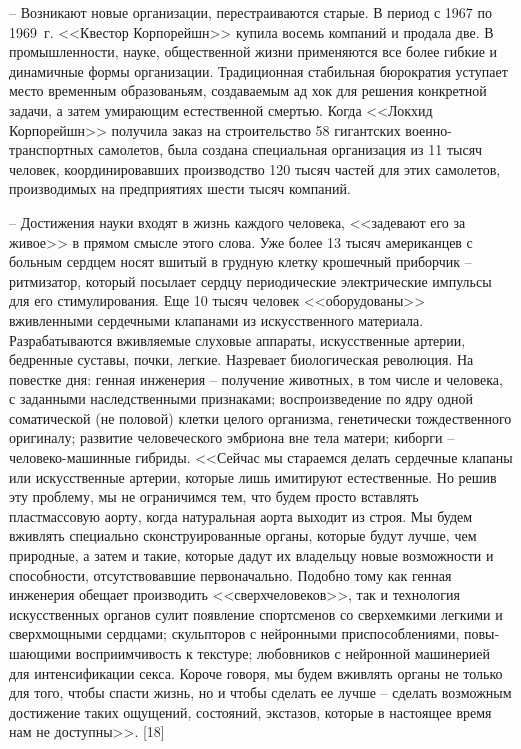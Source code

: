 \documentclass{book}
\begin{document}
-- Возникают новые организации, перестраиваются старые. В период с 1967 по 1969~г. <<Квестор Корпорейшн>> купила восемь компаний и продала две. В промышленности, науке, общественной жизни применяются все более гибкие и динамичные формы организации. Традиционная стабильная бюрократия уступает место временным образованьям, создаваемым ад хок для решения конкретной задачи, а затем умирающим естественной смертью. Когда <<Локхид Корпорейшн>> получила заказ на строительство 58 гигантских военно-транспортных самолетов, была создана специальная организация из 11 тысяч человек, координировавших производство 120 тысяч частей для этих самолетов, производимых на предприятиях шести тысяч компаний.

-- Достижения науки входят в жизнь каждого человека, <<задевают его за живое>> в прямом смысле этого слова. Уже бо­лее 13 тысяч американцев с больным сердцем носят вшитый в грудную клетку крошечный приборчик -- ритмизатор, который посылает сердцу периодические электрические импульсы для его стимулирования. Еще 10 тысяч человек <<оборудованы>> вживленными сердечными клапанами из искусственного материала. Разрабатываются вживляемые слуховые аппараты, искусственные артерии, бедренные суставы, почки, легкие. Назревает биологическая революция. На повестке дня: генная инже­нерия -- получение животных, в том числе и человека, с заданными наследственными признаками; воспроизведение по ядру одной соматической (не половой) клетки целого организма, генетически тождественного оригиналу; развитие человеческого эмбриона вне тела матери; киборги -- человеко-машинные гибриды. <<Сейчас мы стараемся делать сердечные клапаны или искусственные артерии, которые лишь имитируют естественные. Но решив эту проблему, мы не 
ограничимся тем, что будем просто вставлять пластмассовую аорту, когда натуральная аорта выходит из строя. Мы будем вживлять специально сконструированные органы, которые будут лучше,  чем природные, а затем и такие, которые дадут их владельцу новые возможности и способности, отсутствовавшие первоначально. Подобно тому как генная инженерия обещает производить <<сверхчеловеков>>, так и технология искусственных органов сулит появление спортсменов со сверхемкими легкими и сверхмощными серд­цами; скульпторов с нейронными приспособлениями, повы­шающими восприимчивость к текстуре; любовников с ней­ронной машинерией для интенсификации секса. Короче говоря, мы будем вживлять органы не только для того, чтобы спасти жизнь, но и чтобы сделать ее лучше -- сделать возможным дости­жение таких ощущений, состояний, экстазов, которые в насто­ящее время нам не доступны>>. [18]
\end{document}
